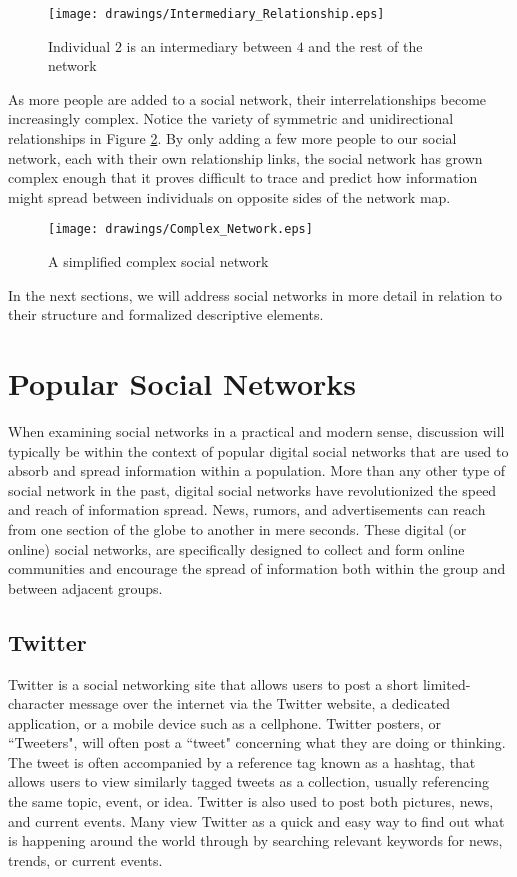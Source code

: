 \begin{figure}[!htbp] \centering
  \texttt{[image: drawings/Intermediary\_Relationship.eps]}
  \caption{Individual $2$ is an intermediary between $4$ and the rest of the network}
  \label{fig:Intermediary_Relationship}
\end{figure}
As more people are added to a social network, their interrelationships become increasingly complex. Notice the variety of symmetric and unidirectional relationships in Figure \ref{fig:Complex_Network}. By only adding a few more people to our social network, each with their own relationship links, the social network has grown complex enough that it proves difficult to trace and predict how information might spread between individuals on opposite sides of the network map. 
\begin{figure}[!htbp] \centering
  \texttt{[image: drawings/Complex\_Network.eps]}
  \caption{A simplified complex social network}
  \label{fig:Complex_Network}
\end{figure}
In the next sections, we will address social networks in more detail in relation to their structure and formalized descriptive elements.

\section{Popular Social Networks}
When examining social networks in a practical and modern sense, discussion will typically be within the context of popular digital social networks that are used to absorb and spread information within a population. More than any other type of social network in the past, digital social networks have revolutionized the speed and reach of information spread. News, rumors, and advertisements can reach from one section of the globe to another in mere seconds. These digital (or online) social networks, are specifically designed to collect and form online communities and encourage the spread of information both within the group and between adjacent groups. 

\subsection{Twitter}
Twitter is a social networking site that allows users to post a short limited-character message over the internet via the Twitter website, a dedicated application, or a mobile device such as a cellphone. Twitter posters, or ``Tweeters", will often post a ``tweet" concerning what they are doing or thinking. The tweet is often accompanied by a reference tag known as a hashtag, that allows users to view similarly tagged tweets as a collection, usually referencing the same topic, event, or idea. Twitter is also used to post both pictures, news, and current events. Many view Twitter as a quick and easy way to find out what is happening around the world through by searching relevant keywords for news, trends, or current events.

